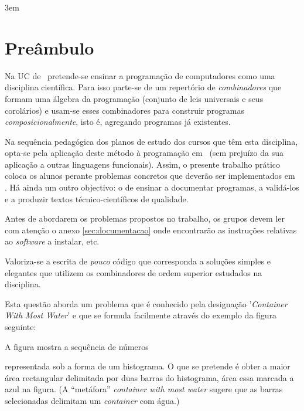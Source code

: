 \documentclass[11pt, a4paper, fleqn]{article}
\newcommand{\Varid}[1]{\mathit{#1}}
\def\resethooks{%
  \global\let\SaveRestoreHook\empty
  \global\let\ColumnHook\empty}
\let\hspre\empty
\let\hspost\empty
\begin{document}
\sffamily
\setlength{\parindent}{0em}
\emergencystretch 3em
\renewcommand{\baselinestretch}{1.25} 

\pagestyle{pagestyle}
\setlength{\parindent}{1em}

\section*{Preâmbulo}

Na UC de \CP\ pretende-se ensinar a progra\-mação de computadores como uma
disciplina científica. Para isso parte-se de um repertório de \emph{combinadores}
que formam uma álgebra da programação (conjunto de leis universais e seus
corolários) e usam-se esses combinadores para construir programas
\emph{composicionalmente}, isto é, agregando programas já existentes.

Na sequência pedagógica dos planos de estudo dos cursos que têm esta disciplina,
opta-se pela aplicação deste método à programação em \Haskell\ (sem prejuízo
da sua aplicação a outras linguagens funcionais). Assim, o presente trabalho
prático coloca os alunos perante problemas concretos que deverão ser implementados
em \Haskell. Há ainda um outro objectivo: o de ensinar a documentar programas,
a validá-los e a produzir textos técnico-científicos de qualidade.

Antes de abordarem os problemas propostos no trabalho, os grupos devem ler
com atenção o anexo \ref{sec:documentacao} onde encontrarão as instruções
relativas ao \emph{software} a instalar, etc.

Valoriza-se a escrita de \emph{pouco} código que corresponda a soluções simples
e elegantes que utilizem os combinadores de ordem superior estudados na disciplina.


\Problema
Esta questão aborda um problema que é conhecido pela designação '\emph{Container
With Most Water}' e que se formula facilmente através do exemplo da figura
seguinte:

	\histogramaA \label{fig:histogramaA}

\noindent A figura mostra a sequência de números
\resethooks
representada sob a forma de um histograma. O que se pretende é obter a maior
área rectangular delimitada por duas barras do histograma, área essa marcada
a azul na figura. (A ``metáfora'' \emph{container with most water} sugere que
as barras selecionadas delimitam um \emph{container} com água.)
\end{document}
